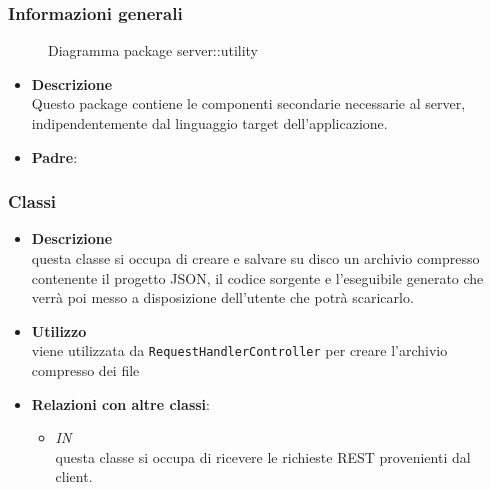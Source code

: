 \subsubsection{Informazioni generali}
\begin{figure}[H]
	\caption{Diagramma package server::utility}
\end{figure}
\begin{itemize}
\item \textbf{Descrizione}\\
Questo package contiene le componenti secondarie necessarie al server, indipendentemente dal linguaggio target dell'applicazione.
\item \textbf{Padre}: \hyperref[\nogloxy{swedesigner::server}]{}
\end{itemize}
\subsubsection{Classi}
\label{\nogloxy{swedesigner::server::utility::Compressor}}
\begin{itemize}
\item \textbf{Descrizione}\\
questa classe si occupa di creare e salvare su disco un archivio compresso contenente il progetto JSON, il codice sorgente e l'eseguibile generato che verrà poi messo a disposizione dell'utente che potrà scaricarlo.
\item \textbf{Utilizzo}\\
viene utilizzata da \texttt{RequestHandlerController} per creare l'archivio compresso dei file
\item \textbf{Relazioni con altre classi}:
\begin{itemize}
\item \textit{IN} \hyperref[\nogloxy{swedesigner::server::controller::RequestHandlerController}]{}\\
questa classe si occupa di ricevere le richieste REST provenienti dal client.
\end{itemize}
\end{itemize}
